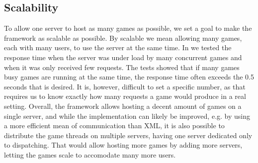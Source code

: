 \subsection{Scalability}
To allow one server to host as many games as possible, we set a goal to make the framework as scalable as possible. By scalable we mean allowing many games, each with many users, to use the server at the same time. In  we tested the response time when the server was under load by many concurrent games and when it was only received few requests.
The tests showed that if many games busy games are running at the same time, the response time often exceeds the 0.5 seconds that is desired. It is, however, difficult to set a specific number, as that requires us to know exactly how many requests a game would produce in a real setting.
Overall, the framework allows hosting a decent amount of games on a single server, and while the implementation can likely be improved, e.g. by using a more efficient mean of communication than XML, it is also possible to distribute the game threads on multiple servers, having one server dedicated only to dispatching. That would allow hosting more games by adding more servers, letting the games scale to accomodate many more users.
